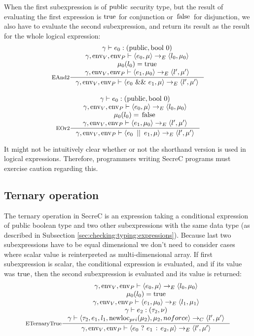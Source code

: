 \documentclass[a4paper, 10pt, draft]{report}
\DeclareMathOperator*{\env}{env}
\DeclareMathOperator*{\newloc}{newloc}
\newcommand{\mycode}[1]{\ensuremath{\mbox{\lstinline{#1}}}}
\begin{document}
When the first subexpression is of \mycode{public} security type, but the
result of evaluating the first expression is \mycode{true} for conjunction or
\mycode{false} for disjunction, we also have to evaluate the second
subexpression, and return its result as the result for the whole logical
expression:
\[
\begin{array}{c}
\inference[EAnd2]{
  \gamma |- e_0 : (\mycode{public}, \mycode{bool}\ 0) \\
  \gamma, \env_V, \env_P |- \left<e_0, \mu \right> \to_E \left< l_0, \mu_0 \right> \\
  \mu_0(l_0) = \mycode{true} \\
  \gamma, \env_V, \env_P |- \left<e_1, \mu_0 \right> \to_E \left< l', \mu' \right> \\
}{
  \gamma, \env_V, \env_P |- \left<e_0\ \mycode{&&}\ e_1, \mu \right> \to_E \left<l', \mu' \right>
} \\[2em]
\inference[EOr2]{
  \gamma |- e_0 : (\mycode{public}, \mycode{bool}\ 0) \\
  \gamma, \env_V, \env_P |- \left<e_0, \mu \right> \to_E \left< l_0, \mu_0 \right> \\
  \mu_0(l_0) = \mycode{false} \\
  \gamma, \env_V, \env_P |- \left<e_1, \mu_0 \right> \to_E \left< l', \mu' \right> \\
}{
  \gamma, \env_V, \env_P |- \left<e_0\ \mycode{||}\ e_1, \mu \right> \to_E \left<l', \mu' \right>
}
\end{array}\]

It might not be intuitively clear whether or not the shorthand version is used
in logical expressions. Therefore, programmers writing SecreC programs must
exercise caution regarding this.

\subsection{Ternary operation}\label{sec:semantics:expr:ternary}

The ternary operation in SecreC is an expression taking a conditional
expression of public boolean type and two other subexpressions with the same
data type (as described in Subsection \ref{sec:checking:typing:expressions}).
Because last two subexpressions have to be equal dimensional we don't need to consider
cases where scalar value is reinterpreted as multi-dimensional array. If first
subexpression is scalar, the conditional expression is evaluated, and if its
value was \mycode{true}, then the second subexpression is evaluated and its
value is returned:
\[\inference[ETernaryTrue]{
  \gamma, \env_V, \env_P |- \left<e_0, \mu \right> \to_E \left< l_0, \mu_0 \right> \\
  \mu_0(l_0) = \mycode{true}\\
  \gamma, \env_V, \env_P |- \left< e_1, \mu_0 \right> \to_E \left< l_1, \mu_1 \right> \\
  \gamma |- e_2 : \left( \tau_2, \nu \right) \\
  \gamma |- \left< \tau_2, e_1, l_1, \newloc_{pri}(\mu_2), \mu_2, noforce \right> \to_C \left< l', \mu' \right>
}{
  \gamma, \env_V, \env_P |- \left< e_0\ \mycode{?}\ e_1\ \mycode{:}\ e_2, \mu \right> \to_E \left< l', \mu' \right>
}\]
\end{document}
